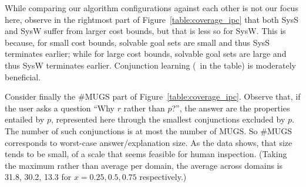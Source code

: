 While comparing our algorithm configurations against each other is not
our focus here, observe in the rightmost part of
Figure~\ref{table:coverage_ipc} that both SysS and SysW suffer from
larger cost bounds, but that is less so for SysW. This is because, for
small cost bounds, solvable goal sets are small and thus SysS
terminates earlier; while for large cost bounds, solvable goal sets
are large and thus SysW terminates earlier. Conjunction learning (\hc\
in the table) is moderately beneficial.
%
%

Consider finally the \#MUGS part of
Figure~\ref{table:coverage_ipc}. Observe that, if the user asks a
question ``Why $r$ rather than $p$?'', the answer are the properties
entailed by $p$, represented here through the smallest conjunctions
excluded by $p$. The number of such conjunctions is at most the number
of MUGS. So \#MUGS corresponds to worst-case answer/explanation
size. As the data shows, that size tends to be small, of a scale that
seems feasible for human inspection. (Taking the maximum rather than
average per domain, the average across domains is 31.8, 30.2, 13.3 for
$x=0.25, 0.5, 0.75$ respectively.)

%








\ifdefined\longflagdefined

